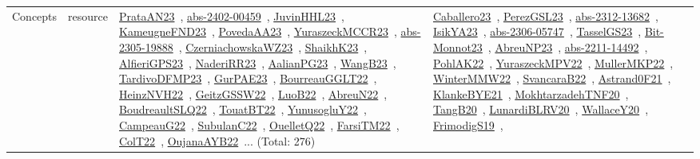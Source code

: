 {\begin{longtable}{lp{3cm}>{\raggedright\arraybackslash}p{6cm}>{\raggedright\arraybackslash}p{6cm}>{\raggedright\arraybackslash}p{8cm}}
Concepts & resource & \href{works/PrataAN23.pdf}{PrataAN23}~\cite{PrataAN23}, \href{works/abs-2402-00459.pdf}{abs-2402-00459}~\cite{abs-2402-00459}, \href{works/JuvinHHL23.pdf}{JuvinHHL23}~\cite{JuvinHHL23}, \href{works/KameugneFND23.pdf}{KameugneFND23}~\cite{KameugneFND23}, \href{works/PovedaAA23.pdf}{PovedaAA23}~\cite{PovedaAA23}, \href{works/YuraszeckMCCR23.pdf}{YuraszeckMCCR23}~\cite{YuraszeckMCCR23}, \href{works/abs-2305-19888.pdf}{abs-2305-19888}~\cite{abs-2305-19888}, \href{works/CzerniachowskaWZ23.pdf}{CzerniachowskaWZ23}~\cite{CzerniachowskaWZ23}, \href{works/ShaikhK23.pdf}{ShaikhK23}~\cite{ShaikhK23}, \href{works/AlfieriGPS23.pdf}{AlfieriGPS23}~\cite{AlfieriGPS23}, \href{works/NaderiRR23.pdf}{NaderiRR23}~\cite{NaderiRR23}, \href{works/AalianPG23.pdf}{AalianPG23}~\cite{AalianPG23}, \href{works/WangB23.pdf}{WangB23}~\cite{WangB23}, \href{works/TardivoDFMP23.pdf}{TardivoDFMP23}~\cite{TardivoDFMP23}, \href{works/GurPAE23.pdf}{GurPAE23}~\cite{GurPAE23}, \href{works/BourreauGGLT22.pdf}{BourreauGGLT22}~\cite{BourreauGGLT22}, \href{works/HeinzNVH22.pdf}{HeinzNVH22}~\cite{HeinzNVH22}, \href{works/GeitzGSSW22.pdf}{GeitzGSSW22}~\cite{GeitzGSSW22}, \href{works/LuoB22.pdf}{LuoB22}~\cite{LuoB22}, \href{works/AbreuN22.pdf}{AbreuN22}~\cite{AbreuN22}, \href{works/BoudreaultSLQ22.pdf}{BoudreaultSLQ22}~\cite{BoudreaultSLQ22}, \href{works/TouatBT22.pdf}{TouatBT22}~\cite{TouatBT22}, \href{works/YunusogluY22.pdf}{YunusogluY22}~\cite{YunusogluY22}, \href{works/CampeauG22.pdf}{CampeauG22}~\cite{CampeauG22}, \href{works/SubulanC22.pdf}{SubulanC22}~\cite{SubulanC22}, \href{works/OuelletQ22.pdf}{OuelletQ22}~\cite{OuelletQ22}, \href{works/FarsiTM22.pdf}{FarsiTM22}~\cite{FarsiTM22}, \href{works/ColT22.pdf}{ColT22}~\cite{ColT22}, \href{works/OujanaAYB22.pdf}{OujanaAYB22}~\cite{OujanaAYB22}... (Total: 276) & \href{works/Caballero23.pdf}{Caballero23}~\cite{Caballero23}, \href{works/PerezGSL23.pdf}{PerezGSL23}~\cite{PerezGSL23}, \href{works/abs-2312-13682.pdf}{abs-2312-13682}~\cite{abs-2312-13682}, \href{works/IsikYA23.pdf}{IsikYA23}~\cite{IsikYA23}, \href{works/abs-2306-05747.pdf}{abs-2306-05747}~\cite{abs-2306-05747}, \href{works/TasselGS23.pdf}{TasselGS23}~\cite{TasselGS23}, \href{works/Bit-Monnot23.pdf}{Bit-Monnot23}~\cite{Bit-Monnot23}, \href{works/AbreuNP23.pdf}{AbreuNP23}~\cite{AbreuNP23}, \href{works/abs-2211-14492.pdf}{abs-2211-14492}~\cite{abs-2211-14492}, \href{works/PohlAK22.pdf}{PohlAK22}~\cite{PohlAK22}, \href{works/YuraszeckMPV22.pdf}{YuraszeckMPV22}~\cite{YuraszeckMPV22}, \href{works/MullerMKP22.pdf}{MullerMKP22}~\cite{MullerMKP22}, \href{works/WinterMMW22.pdf}{WinterMMW22}~\cite{WinterMMW22}, \href{works/SvancaraB22.pdf}{SvancaraB22}~\cite{SvancaraB22}, \href{works/Astrand0F21.pdf}{Astrand0F21}~\cite{Astrand0F21}, \href{works/KlankeBYE21.pdf}{KlankeBYE21}~\cite{KlankeBYE21}, \href{works/MokhtarzadehTNF20.pdf}{MokhtarzadehTNF20}~\cite{MokhtarzadehTNF20}, \href{works/TangB20.pdf}{TangB20}~\cite{TangB20}, \href{works/LunardiBLRV20.pdf}{LunardiBLRV20}~\cite{LunardiBLRV20}, \href{works/WallaceY20.pdf}{WallaceY20}~\cite{WallaceY20}, \href{works/FrimodigS19.pdf}{FrimodigS19}~\cite{FrimodigS19}, 
\end{longtable}}
